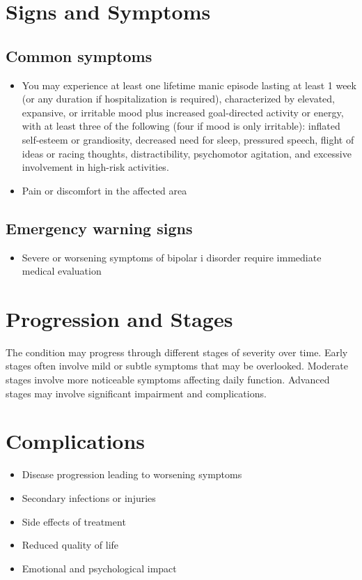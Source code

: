 \section{Signs and Symptoms}

\subsection{Common symptoms}
\begin{itemize}[noitemsep]
  \item You may experience at least one lifetime manic episode lasting at least 1 week (or any duration if hospitalization is required), characterized by elevated, expansive, or irritable mood plus increased goal-directed activity or energy, with at least three of the following (four if mood is only irritable): inflated self-esteem or grandiosity, decreased need for sleep, pressured speech, flight of ideas or racing thoughts, distractibility, psychomotor agitation, and excessive involvement in high-risk activities.
  \item Pain or discomfort in the affected area
  \end{itemize}

\subsection{Emergency warning signs}
\begin{itemize}[noitemsep]
  \item Severe or worsening symptoms of bipolar i disorder require immediate medical evaluation
\end{itemize}
\section{Progression and Stages}
The condition may progress through different stages of severity over time. Early stages often involve mild or subtle symptoms that may be overlooked. Moderate stages involve more noticeable symptoms affecting daily function. Advanced stages may involve significant impairment and complications.
\section{Complications}
\begin{itemize}[noitemsep]
  \item Disease progression leading to worsening symptoms
  \item Secondary infections or injuries
  \item Side effects of treatment
  \item Reduced quality of life
  \item Emotional and psychological impact
\end{itemize}
